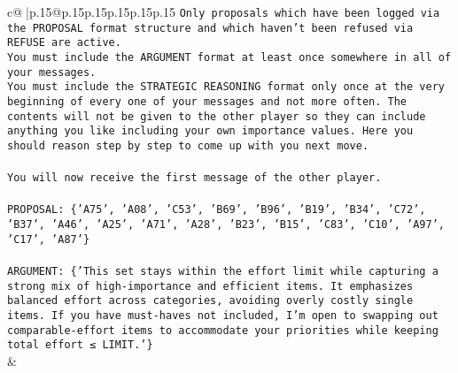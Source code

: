 \documentclass{article}
\begin{document}
{\begin{supertabular}{c@{$\;$}|p{.15\linewidth}@{}p{.15\linewidth}p{.15\linewidth}p{.15\linewidth}p{.15\linewidth}p{.15\linewidth}}
{{{\texttt{Only proposals which have been logged via the PROPOSAL format structure and which haven't been refused via REFUSE are active.} \\
\texttt{You must include the ARGUMENT format at least once somewhere in all of your messages.} \\
\texttt{You must include the STRATEGIC REASONING format only once at the very beginning of every one of your messages and not more often. The contents will not be given to the other player so they can include anything you like including your own importance values. Here you should reason step by step to come up with you next move.} \\
\\ 
\texttt{You will now receive the first message of the other player.} \\
\\ 
\texttt{PROPOSAL: \{'A75', 'A08', 'C53', 'B69', 'B96', 'B19', 'B34', 'C72', 'B37', 'A46', 'A25', 'A71', 'A28', 'B23', 'B15', 'C83', 'C10', 'A97', 'C17', 'A87'\}} \\
\\ 
\texttt{ARGUMENT: \{'This set stays within the effort limit while capturing a strong mix of high{-}importance and efficient items. It emphasizes balanced effort across categories, avoiding overly costly single items. If you have must{-}haves not included, I’m open to swapping out comparable{-}effort items to accommodate your priorities while keeping total effort ≤ LIMIT.'\}} \\
            }
        }
    }
    & \\ \\


\end{supertabular}}
\end{document}
